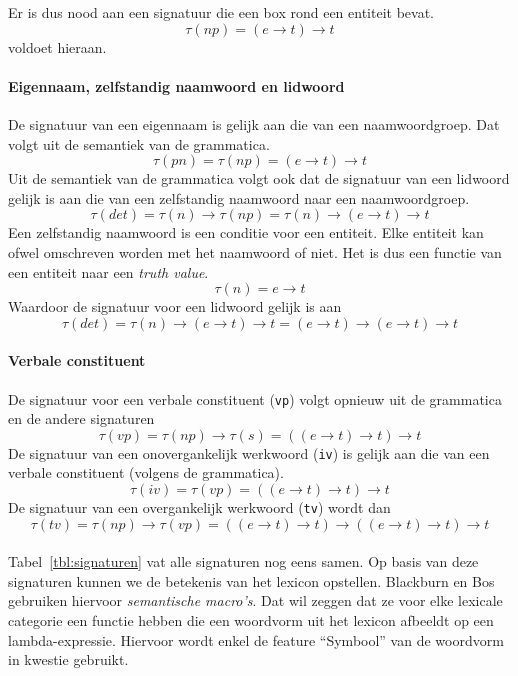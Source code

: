 Er is dus nood aan een signatuur die een box rond een entiteit bevat. $$\tau(np) = (e \rightarrow t) \rightarrow t$$ voldoet hieraan.

\paragraph{Eigennaam, zelfstandig naamwoord en lidwoord} De signatuur van een eigennaam is gelijk aan die van een naamwoordgroep. Dat volgt uit de semantiek van de grammatica. $$\tau(pn) = \tau(np) = (e \rightarrow t) \rightarrow t$$ Uit de semantiek van de grammatica volgt ook dat de signatuur van een lidwoord gelijk is aan die van een zelfstandig naamwoord naar een naamwoordgroep. $$ \tau(det) = \tau(n) \rightarrow \tau(np) = \tau(n) \rightarrow (e \rightarrow t) \rightarrow t$$ Een zelfstandig naamwoord is een conditie voor een entiteit. Elke entiteit kan ofwel omschreven worden met het naamwoord of niet. Het is dus een functie van een entiteit naar een \textit{truth value}. $$\tau(n) = e \rightarrow t$$ Waardoor de signatuur voor een lidwoord gelijk is aan $$ \tau(det) = \tau(n) \rightarrow (e \rightarrow t) \rightarrow t = (e \rightarrow t) \rightarrow (e \rightarrow t) \rightarrow t $$

\paragraph{Verbale constituent} De signatuur voor een verbale constituent (\texttt{vp}) volgt opnieuw uit de grammatica en de andere signaturen $$\tau(vp) = \tau(np) \rightarrow \tau(s) = ((e \rightarrow t) \rightarrow t) \rightarrow t$$ De signatuur van een onovergankelijk werkwoord (\texttt{iv}) is gelijk aan die van een verbale constituent (volgens de grammatica). $$\tau(iv) = \tau(vp) = ((e \rightarrow t) \rightarrow t) \rightarrow t$$ De signatuur van een overgankelijk werkwoord (\texttt{tv}) wordt dan $$\tau(tv) = \tau(np) \rightarrow \tau(vp) = ((e \rightarrow t) \rightarrow t) \rightarrow ((e \rightarrow t) \rightarrow t) \rightarrow t$$

\paragraph{} Tabel~\ref{tbl:signaturen} vat alle signaturen nog eens samen. Op basis van deze signaturen kunnen we de betekenis van het lexicon opstellen. Blackburn en Bos gebruiken hiervoor \textit{semantische macro's}. Dat wil zeggen dat ze voor elke lexicale categorie een functie hebben die een woordvorm uit het lexicon afbeeldt op een lambda-expressie. Hiervoor wordt enkel de feature ``Symbool'' van de woordvorm in kwestie gebruikt.

